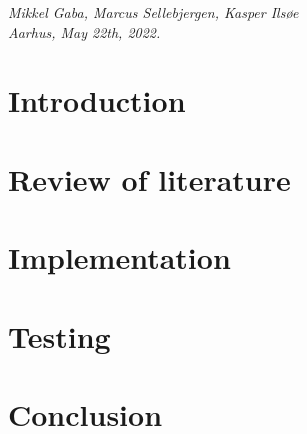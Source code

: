 \documentclass[11pt,openright]{report}
\theoremstyle{definition}
\begin{document}


\vspace{2ex}
\begin{flushright}
  \emph{Mikkel Gaba, Marcus Sellebjergen, Kasper Ils{\o}e}\\
  \emph{Aarhus, May 22th, 2022.}
\end{flushright}

\tableofcontents
\cleardoublepage
{}
\setcounter{secnumdepth}{2}


\chapter{Introduction}
\label{ch:intro}





\chapter{Review of literature}
\label{ch:main1}








\chapter{Implementation}
\label{ch:main2}







\chapter{Testing}
\label{ch:main3}




\chapter{Conclusion}
\label{ch:conclusion}
\end{document}
